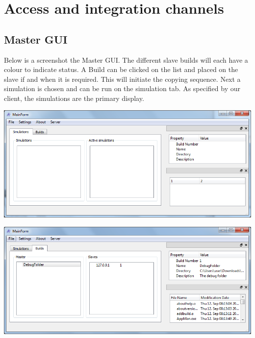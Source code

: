 \documentclass[a4paper,12pt,final]{article}
\begin{document}
\newpage
\section{Access and integration channels}
\subsection{Master GUI}
Below is a screenshot the Master GUI. The different slave builds will each have a colour to indicate status. A Build can be clicked on the list and placed on the slave if and when it is required. This will initiate the copying sequence. Next a simulation is chosen and can be run on the simulation tab. As specified by our client, the simulations are the primary display.
\begin{center}
  	\includegraphics[scale=0.6]{AppManGuiSimPage.png}
 \end{center}
\begin{center}
  	\includegraphics[scale=0.6]{AppManGuiBuildPage.png}
 \end{center}
 \newpage
\end{document}
